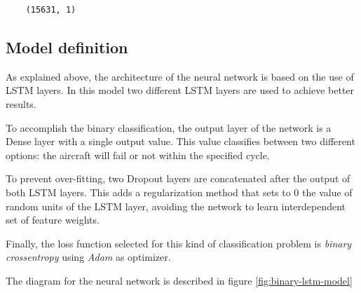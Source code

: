 \begin{verbatim}
    (15631, 1)
\end{verbatim}


\subsection{Model definition}

As explained above, the architecture of the neural network is based on the use of LSTM layers.
In this model two different LSTM layers are used to achieve better results.

To accomplish the binary classification, the output layer of the network is a Dense layer with a single output value.
This value classifies between two different options: the aircraft will fail or not within the specified cycle.

To prevent over-fitting, two Dropout layers are concatenated after the output of both LSTM layers.
This adds a regularization method that sets to 0 the value of random units of the LSTM layer, avoiding the network to learn interdependent set of feature weights.

Finally, the loss function selected for this kind of classification problem is \textit{binary crossentropy} using \textit{Adam} as optimizer.

The diagram for the neural network is described in figure \ref{fig:binary-lstm-model}

